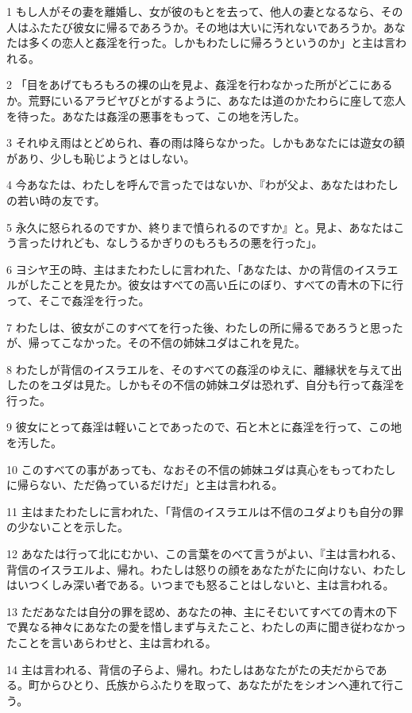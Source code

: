 \par 1 もし人がその妻を離婚し、女が彼のもとを去って、他人の妻となるなら、その人はふたたび彼女に帰るであろうか。その地は大いに汚れないであろうか。あなたは多くの恋人と姦淫を行った。しかもわたしに帰ろうというのか」と主は言われる。
\par 2 「目をあげてもろもろの裸の山を見よ、姦淫を行わなかった所がどこにあるか。荒野にいるアラビヤびとがするように、あなたは道のかたわらに座して恋人を待った。あなたは姦淫の悪事をもって、この地を汚した。
\par 3 それゆえ雨はとどめられ、春の雨は降らなかった。しかもあなたには遊女の額があり、少しも恥じようとはしない。
\par 4 今あなたは、わたしを呼んで言ったではないか、『わが父よ、あなたはわたしの若い時の友です。
\par 5 永久に怒られるのですか、終りまで憤られるのですか』と。見よ、あなたはこう言ったけれども、なしうるかぎりのもろもろの悪を行った」。
\par 6 ヨシヤ王の時、主はまたわたしに言われた、「あなたは、かの背信のイスラエルがしたことを見たか。彼女はすべての高い丘にのぼり、すべての青木の下に行って、そこで姦淫を行った。
\par 7 わたしは、彼女がこのすべてを行った後、わたしの所に帰るであろうと思ったが、帰ってこなかった。その不信の姉妹ユダはこれを見た。
\par 8 わたしが背信のイスラエルを、そのすべての姦淫のゆえに、離縁状を与えて出したのをユダは見た。しかもその不信の姉妹ユダは恐れず、自分も行って姦淫を行った。
\par 9 彼女にとって姦淫は軽いことであったので、石と木とに姦淫を行って、この地を汚した。
\par 10 このすべての事があっても、なおその不信の姉妹ユダは真心をもってわたしに帰らない、ただ偽っているだけだ」と主は言われる。
\par 11 主はまたわたしに言われた、「背信のイスラエルは不信のユダよりも自分の罪の少ないことを示した。
\par 12 あなたは行って北にむかい、この言葉をのべて言うがよい、『主は言われる、背信のイスラエルよ、帰れ。わたしは怒りの顔をあなたがたに向けない、わたしはいつくしみ深い者である。いつまでも怒ることはしないと、主は言われる。
\par 13 ただあなたは自分の罪を認め、あなたの神、主にそむいてすべての青木の下で異なる神々にあなたの愛を惜しまず与えたこと、わたしの声に聞き従わなかったことを言いあらわせと、主は言われる。
\par 14 主は言われる、背信の子らよ、帰れ。わたしはあなたがたの夫だからである。町からひとり、氏族からふたりを取って、あなたがたをシオンへ連れて行こう。

